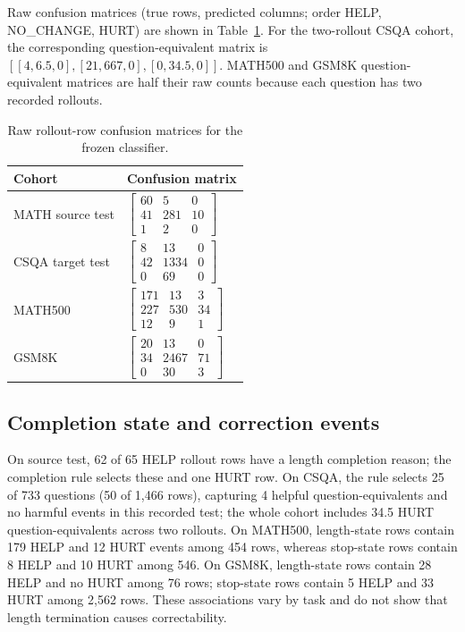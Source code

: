 \documentclass[conference]{IEEEtran}
\begin{document}
Raw confusion matrices (true rows, predicted columns; order HELP, NO\_CHANGE, HURT) are shown in Table~\ref{tab:confusion}. For the two-rollout CSQA cohort, the corresponding question-equivalent matrix is $[[4,6.5,0],[21,667,0],[0,34.5,0]]$. MATH500 and GSM8K question-equivalent matrices are half their raw counts because each question has two recorded rollouts.

\begin{table}[t]
\caption{Raw rollout-row confusion matrices for the frozen classifier.}
\label{tab:confusion}
\centering\small
\begin{tabular}{ll}
\toprule
\textbf{Cohort} & \textbf{Confusion matrix}\\
\midrule
MATH source test & $\begin{bmatrix}60&5&0\\41&281&10\\1&2&0\end{bmatrix}$\\
CSQA target test & $\begin{bmatrix}8&13&0\\42&1334&0\\0&69&0\end{bmatrix}$\\
MATH500 & $\begin{bmatrix}171&13&3\\227&530&34\\12&9&1\end{bmatrix}$\\
GSM8K & $\begin{bmatrix}20&13&0\\34&2467&71\\0&30&3\end{bmatrix}$\\
\bottomrule
\end{tabular}
\end{table}

\subsection{Completion state and correction events}
On source test, 62 of 65 HELP rollout rows have a length completion reason; the completion rule selects these and one HURT row. On CSQA, the rule selects 25 of 733 questions (50 of 1,466 rows), capturing 4 helpful question-equivalents and no harmful events in this recorded test; the whole cohort includes 34.5 HURT question-equivalents across two rollouts. On MATH500, length-state rows contain 179 HELP and 12 HURT events among 454 rows, whereas stop-state rows contain 8 HELP and 10 HURT among 546. On GSM8K, length-state rows contain 28 HELP and no HURT among 76 rows; stop-state rows contain 5 HELP and 33 HURT among 2,562 rows. These associations vary by task and do not show that length termination causes correctability.
\end{document}
